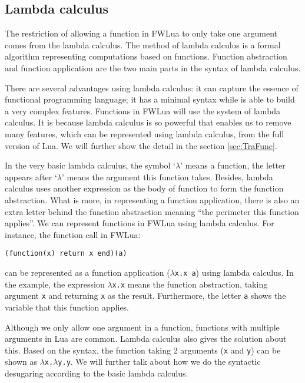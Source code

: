 \subsection{Lambda calculus}
The restriction of allowing a function in FWLua to only take one argument comes from the lambda calculus. The method of lambda calculus is a formal algorithm representing computations based on functions. Function abstraction and function application are the two main parts in the syntax of lambda calculus. 

There are several advantages using lambda calculus: it can capture the essence of functional programming language; it has a minimal syntax while is able to build a very complex features. Functions in FWLua will use the system of lambda calculus. It is because lambda calculus is so powerful that enables us to remove many features, which can be represented using lambda calculus, from the full version of Lua. We will further show the detail in the section \ref{sec:TraFunc}.

In the very basic lambda calculus, the symbol `$\lambda$' means a function, the letter appears after `$\lambda$' means the argument this function takes.
Besides, lambda calculus uses another expression as the body of function to form the function abstraction. What is more, in representing a function application, there is also an extra letter behind the function abstraction meaning ``the perimeter this function applies''. We can represent functions in FWLua using lambda calculus. For instance, the function call in FWLua:

\begin{verbatim}
(function(x) return x end)(a)
\end{verbatim}
can be represented as a function application ({\tt $\lambda$x.x a}) using lambda calculus. In the example, the expression {\tt $\lambda$x.x} means the function abstraction, taking argument {\tt x} and returning {\tt x} as the result. Furthermore, the letter {\tt a} shows the variable that this function applies.

Although we only allow one argument in a function, functions with multiple arguments in Lua are common. Lambda calculus also gives the solution about this. Based on the syntax, the function taking 2 arguments ({\tt x} and {\tt y}) can be shown as {\tt $\lambda$x.$\lambda$y.y}. We will further talk about how we do the syntactic desugaring according to the basic lambda calculus.


